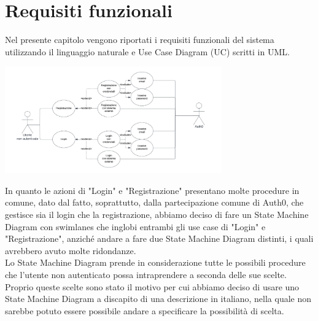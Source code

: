 \section{Requisiti funzionali}
\label{secD2:RequisitiFunzionali}

Nel presente capitolo vengono riportati i requisiti funzionali del sistema utilizzando il linguaggio naturale e Use Case Diagram (UC) scritti in UML.

\begin{listaPersonale}[UC]{}

    \begin{center}
        \includegraphics[width=0.7\textwidth]{img/Diagrammi/UseCases/AccessoRegistrazione.png}
    \end{center}
    In quanto le azioni di "Login" e "Registrazione" presentano molte procedure in comune, dato dal fatto, soprattutto, dalla partecipazione comune di Auth0, che gestisce sia il login che la registrazione, abbiamo deciso di fare un State Machine Diagram con swimlanes che inglobi entrambi gli use case di "Login" e "Registrazione", anziché andare a fare due State Machine Diagram distinti, i quali avrebbero avuto molte ridondanze. \\ Lo State Machine Diagram prende in considerazione tutte le possibili procedure che l'utente non autenticato  possa intraprendere a seconda delle sue scelte. Proprio queste scelte sono stato il motivo per cui abbiamo deciso di usare uno State Machine Diagram a discapito di una descrizione in italiano, nella quale non sarebbe potuto essere possibile andare a specificare la possibilità di scelta.


\end{listaPersonale}
